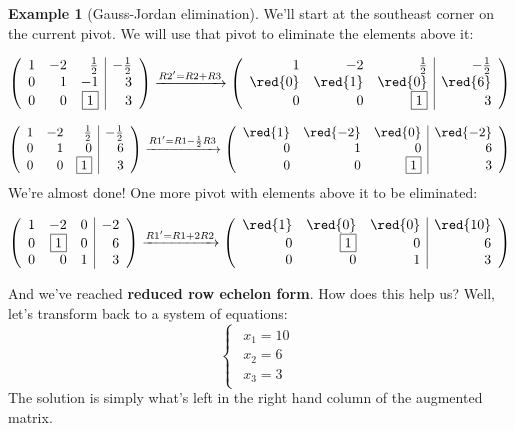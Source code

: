 \documentclass[
]{article}
\theoremstyle{definition}
\theoremstyle{definition}
\newtheorem{example}{Example}[section]
\theoremstyle{definition}
\theoremstyle{definition}
\theoremstyle{remark}
\begin{document}
\begin{example}[Gauss-Jordan elimination]
We'll start at the southeast corner on the current pivot. We will use that pivot to eliminate the elements above it:

\[\left(\begin{array}{rrr|r} 1&-2&\frac{1}{2}&-\frac{1}{2}\\0&1&-1&3\\0&0&\fbox{1}&3\end{array}\right) \xrightarrow{R2'=R2+R3} \left(\begin{array}{rrr|r} 1&-2&\frac{1}{2}&-\frac{1}{2}\\\red{0}&\red{1}&\red{0}&\red{6}\\0&0&\fbox{1}&3\end{array}\right)\]

\[ \left(\begin{array}{rrr|r} 1&-2&\frac{1}{2}&-\frac{1}{2}\\0&1&0&6\\0&0&\fbox{1}&3\end{array}\right)\xrightarrow{R1'=R1-\frac{1}{2}R3}\left(\begin{array}{rrr|r} \red{1}&\red{-2}&\red{0}&\red{-2}\\0&1&0&6\\0&0&\fbox{1}&3\end{array}\right)\]
We're almost done! One more pivot with elements above it to be eliminated:

\[\left(\begin{array}{rrr|r} 1&-2&0&-2\\0&\fbox{1}&0&6\\0&0&1&3\end{array}\right) \xrightarrow{R1'=R1+2R2}
\left(\begin{array}{rrr|r}\red{1}&\red{0}&\red{0}&\red{10}\\0&\fbox{1}&0&6\\0&0&1&3\end{array}\right)\]

And we've reached \textbf{reduced row echelon form}. How does this help us? Well, let's transform back to a system of equations:
\[\begin{cases}\begin{align}
x_1 = 10\\
x_2= 6\\
x_3 =3\end{align}\end{cases}\]
The solution is simply what's left in the right hand column of the augmented matrix.

\end{example}
\end{document}
